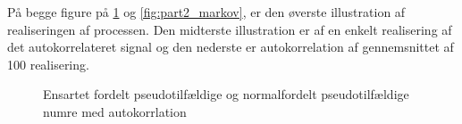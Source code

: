På begge figure på \ref{fig:part2_ran} og \ref{fig:part2_markov}, er den øverste illustration af realiseringen af processen. Den midterste illustration er af en enkelt realisering af det autokorrelateret signal og den nederste er autokorrelation af gennemsnittet af 100 realisering.  
 \begin{figure}[!h]
	\centering
	\caption{ Ensartet fordelt pseudotilfældige og normalfordelt pseudotilfældige numre med autokorrlation }
	\label{fig:part2_ran}
\end{figure}

